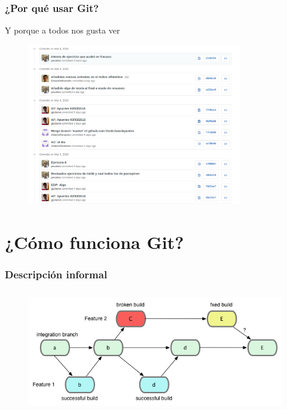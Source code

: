 \documentclass[10pt,compress,usetitleprogressbar,aspectratio=1610,mathserif,notes]{beamer}
\begin{document}
\begin{frame}
\frametitle{¿Por qué usar Git?}

Y porque a todos nos gusta ver
\begin{figure}[b]
\centering
\includegraphics[height = 200pt]{gitCommits.png}
\end{figure}
\end{frame}

\section{¿Cómo funciona Git?}
\begin{frame}
\frametitle{Descripción informal}

\begin{figure}[b]
\centering
\includegraphics[height = 150pt]{gitProcess.png}
\end{figure}
\end{frame}
\end{document}
